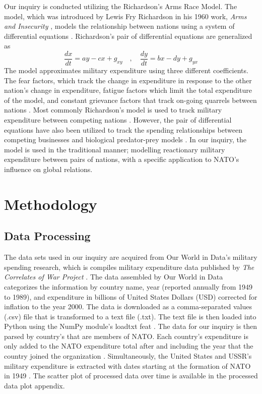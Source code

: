 \documentclass[12pt, centerh1]{article}
\begin{document}
Our inquiry is conducted utilizing the Richardson's Arms Race Model. The model, which was introduced by Lewis Fry Richardson in his 1960 work, \emph{Arms and Insecurity} \citep{smith2020influence}, models the relationship between nations using a system of differential equations \citep{mooney1999course}. Richardson's pair of differential equations are generalized as 
\begin{equation*}\label{NS}
    \frac{dx}{dt}= ay - cx + g_{xy} \quad ,\quad \frac{dy}{dt} = bx - dy + g_{yx}
\end{equation*}
The model approximates military expenditure using three different coefficients. The fear factors, which track the change in expenditure in response to the other nation's change in expenditure, fatigue factors which limit the total expenditure of the model, and constant grievance factors that track on-going quarrels between nations \citep{mooney1999course}. Most commonly Richardson's model is used to track military expenditure between competing nations \citep{smith2020influence}. However, the pair of differential equations have also been utilized to track the spending relationships between competing businesses \citep{chalikias2014implementation} and biological predator-prey models \citep{smith2020influence}. In our inquiry, the model is used in the traditional manner; modelling reactionary military expenditure between pairs of nations, with a specific application to NATO's influence on global relations. 


\section{Methodology}

\subsection{Data Processing}

The data sets used in our inquiry are acquired from Our World in Data's military spending research, which is compiles military expenditure data published by \emph{The Correlates of War Project} \citep{owidmilitaryspending}. The data assembled by Our World in Data categorizes the information by country name, year (reported annually from 1949 to 1989), and expenditure in billions of United States Dollars (USD) corrected for inflation to the year 2000.  The data is downloaded as a comma-separated values (.csv) file that is transformed to a text file (.txt). The text file is then loaded into Python \citep{10.5555/1593511} using the NumPy module's loadtxt feat \citep{2020NumPy-Array}. The data for our inquiry is then parsed by country's that are members of NATO. Each country's expenditure is only added to the NATO expenditure total after and including the year that the country joined the organization \citep{nato_2020}. Simultaneously, the United States and USSR's military expenditure is extracted with dates starting at the formation of NATO in 1949 \citep{nato_2020}. The scatter plot of processed data over time is available in the processed data plot appendix. 
\end{document}
